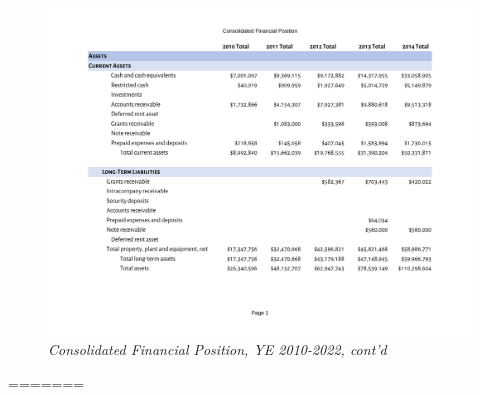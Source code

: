 \begin{figure}
  \caption*{\textit{Consolidated Financial Position, YE 2010-2022, cont'd}}
 \label{fig:consolidated_financial_position_2010-2022} %
 \includegraphics[page=4,width=\textheight]{Consolidated_Financial_Position_Years_2010-2022} %
\end{figure}
=======
